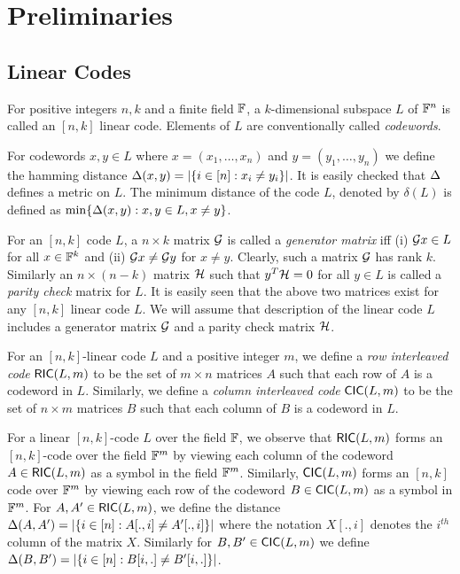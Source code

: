 \section{Preliminaries}
\subsection{Linear Codes}
\begin{definition}\label{defn:lincode}
For positive integers $n,k$ and a finite field $\mathbb{F}$, a $k$-dimensional
subspace $L$ of $\mathbb{F}^n$ is called an $[n,k]$ linear code. Elements of $L$ are
conventionally called {\em codewords}. 
\end{definition}

For codewords $x,y\in L$ where $x=(x_1,\ldots,x_n)$ and $y=(y_1,\ldots,y_n)$ we
define the hamming distance $\Delta(x,y)=|\{i\in [n]: x_i\neq y_i\}|$. It is
easily checked that $\Delta$ defines a metric on $L$. The minimum distance of
the code $L$, denoted by $\delta(L)$ is defined as $\min\{\Delta(x,y):x,y\in L,
x\neq y\}$.

For an $[n,k]$ code $L$, a $n\times k$ matrix $\mathcal{G}$ is called a {\em generator
matrix} iff (i) $\mathcal{G} x\in L$ for all $x\in\mathbb{F}^k$ and (ii) $\mathcal{G} x\neq
\mathcal{G} y$ for $x\neq
y$. Clearly, such a matrix $\mathcal{G}$ has rank $k$. Similarly an $n\times (n-k)$
matrix $\mathcal{H}$ such that $y^T\mathcal{H}=0$ for all $y\in L$ is called a {\em parity check}
matrix for $L$. It is easily seen that the above two matrices exist for any
$[n,k]$ linear code $L$. We will assume that description of the linear code $L$
includes a generator matrix $\mathcal{G}$ and a parity check matrix $\mathcal{H}$.

\begin{definition}\label{defn:interleavedcode}
For an $[n,k]$-linear code $L$ and a positive integer $m$, we define a {\em row
interleaved code} $\mathsf{RIC}(L,m)$ to be the set of $m\times n$ matrices $A$ such that
each row of $A$ is a codeword in $L$. Similarly, we define a {\em column
interleaved code} $\mathsf{CIC}(L,m)$ to be the set of $n\times m$ matrices $B$ such
that each column of $B$ is a codeword in $L$.
\end{definition}

For a linear $[n,k]$-code $L$ over the field $\mathbb{F}$, we observe that
$\mathsf{RIC}(L,m)$ forms an $[n,k]$-code over the field $\mathbb{F}^m$ by viewing each
column of the codeword $A\in \mathsf{RIC}(L,m)$ as a symbol in the field $\mathbb{F}^m$.
Similarly, $\mathsf{CIC}(L,m)$ forms an $[n,k]$ code over $\mathbb{F}^m$ by viewing each row
of the codeword $B\in \mathsf{CIC}(L,m)$ as a symbol in $\mathbb{F}^m$. For $A,A'\in
\mathsf{RIC}(L,m)$, we define the distance $\Delta(A,A')=|\{i\in [n]: A[.,i]\neq
A'[.,i]\}|$ where the notation $X[.,i]$ denotes the $i^{th}$ column of the
matrix $X$. Similarly for $B,B'\in \mathsf{CIC}(L,m)$ we define $\Delta(B,B')=|\{i\in
[n]: B[i,.]\neq B'[i,.]\}|$.
 
